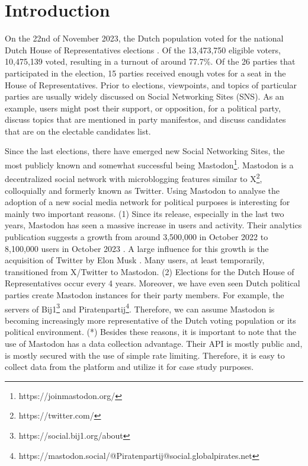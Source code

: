 \section{Introduction}
On the 22nd of November 2023, the Dutch population voted for the national Dutch House of Representatives elections \cite{kies}.
Of the 13,473,750 eligible voters, 10,475,139 voted, resulting in a turnout of around 77.7\%.
Of the 26 parties that participated in the election, 15 parties received enough votes for a seat in the House of Representatives.
Prior to elections, viewpoints, and topics of particular parties are usually widely discussed on Social Networking Sites (SNS).
As an example, users might post their support, or opposition, for a political party, discuss topics that are mentioned in party manifestos, and discuss candidates that are on the electable candidates list.

Since the last elections, there have emerged new Social Networking Sites, the most publicly known and somewhat successful being Mastodon\footnote{https://joinmastodon.org/}.
Mastodon is a decentralized social network with microblogging features similar to X\footnote{https://twitter.com/}, colloquially and formerly known as Twitter.
Using Mastodon to analyse the adoption of a new social media network for political purposes is interesting for mainly two important reasons. 
(1) Since its release, especially in the last two years, Mastodon has seen a massive increase in users and activity.
Their analytics publication suggests a growth from around 3,500,000 in October 2022 to 8,100,000 users in October 2023 \cite{analytics}.
A large influence for this growth is the acquisition of Twitter by Elon Musk \cite{musk}.
Many users, at least temporarily, transitioned from X/Twitter to Mastodon.
(2) Elections for the Dutch House of Representatives occur every 4 years.
Moreover, we have even seen Dutch political parties create Mastodon instances for their party members.
For example, the servers of Bij1\footnote{https://social.bij1.org/about} and Piratenpartij\footnote{https://mastodon.social/@Piratenpartij@social.globalpirates.net}.
Therefore, we can assume Mastodon is becoming increasingly more representative of the Dutch voting population or its political environment.
(*) Besides these reasons, it is important to note that the use of Mastodon has a data collection advantage.
Their API is mostly public and, is mostly secured with the use of simple rate limiting.
Therefore, it is easy to collect data from the platform and utilize it for case study purposes.


